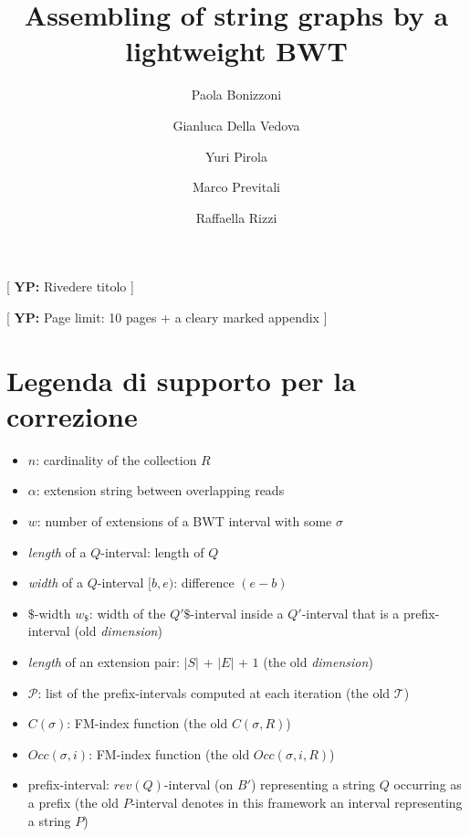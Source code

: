 \documentclass[runningheads,envcountsame,a4paper]{llncs}
\newcommand{\notaestesa}[2]{%
 \marginpar{\color{red!75!black}\textbf{\texttimes}}%
 {\color{red!75!black}%
 [\,\textbullet\,\textsf{\textbf{#1:}} %
 \textsf{\footnotesize#2}\,\textbullet\,]}%
}
\newcommand{\YP}[1]{\notaestesa{YP}{#1}}
\newcommand{\etal}{\textit{et al.}\xspace}
\begin{document}
\title{Assembling of string graphs by a lightweight BWT}

\author{%
  Paola Bonizzoni \and
  Gianluca Della Vedova \and
  Yuri Pirola \and
  Marco Previtali \and
  Raffaella Rizzi
}
\authorrunning{Bonizzoni \etal}


\maketitle

\YP{Rivedere titolo}

\YP{Page limit: 10 pages + a cleary marked appendix}

\begin{abstract}


\end{abstract}

\section*{Legenda di supporto per la correzione}
\begin{itemize}
\item $n$: cardinality of the collection $R$
\item $\alpha$: extension string between overlapping reads
\item $w$: number of extensions of a BWT interval with some $\sigma$
\item \emph{length} of a $Q$-interval: length of $Q$
\item \emph{width} of a $Q$-interval $[b,e)$: difference $(e-b)$
\item $\$$-width $w_{\$}$: width of the $Q'\$$-interval inside a $Q'$-interval that is a prefix-interval (old \emph{dimension})
\item \emph{length} of an extension pair: $|S|$ + $|E|$ + $1$ (the old \emph{dimension})
\item $\mathcal{P}$: list of the prefix-intervals computed at each iteration (the old $\mathcal{T}$)
\item $C(\sigma)$: FM-index function (the old $C(\sigma, R)$)
\item $Occ(\sigma, i)$: FM-index function (the old $Occ(\sigma, i, R)$)
\item prefix-interval: $rev(Q)$-interval (on $B'$) representing a string $Q$ occurring as a prefix (the old $P$-interval denotes in this framework an interval representing a string $P$)
\end{itemize}
\end{document}

